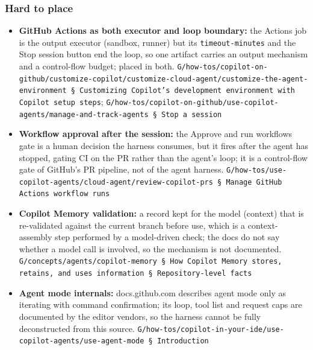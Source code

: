 \subsubsection*{Hard to place}
\begin{itemize}
\item \textbf{GitHub Actions as both executor and loop boundary:} the Actions job is the output executor (sandbox, runner) but its \texttt{timeout-\allowbreak{}minutes} and the Stop session button end the loop, so one artifact carries an output mechanism and a control-flow budget; placed in both. \texttt{G/\allowbreak{}how-\allowbreak{}tos/\allowbreak{}copilot-\allowbreak{}on-\allowbreak{}github/\allowbreak{}customize-\allowbreak{}copilot/\allowbreak{}customize-\allowbreak{}cloud-\allowbreak{}agent/\allowbreak{}customize-\allowbreak{}the-\allowbreak{}agent-\allowbreak{}environment § Customizing Copilot's development environment with Copilot setup steps}; \texttt{G/\allowbreak{}how-\allowbreak{}tos/\allowbreak{}copilot-\allowbreak{}on-\allowbreak{}github/\allowbreak{}use-\allowbreak{}copilot-\allowbreak{}agents/\allowbreak{}manage-\allowbreak{}and-\allowbreak{}track-\allowbreak{}agents § Stop a session}
\item \textbf{Workflow approval after the session:} the Approve and run workflows gate is a human decision the harness consumes, but it fires after the agent has stopped, gating CI on the PR rather than the agent's loop; it is a control-flow gate of GitHub's PR pipeline, not of the agent harness. \texttt{G/\allowbreak{}how-\allowbreak{}tos/\allowbreak{}use-\allowbreak{}copilot-\allowbreak{}agents/\allowbreak{}cloud-\allowbreak{}agent/\allowbreak{}review-\allowbreak{}copilot-\allowbreak{}prs § Manage GitHub Actions workflow runs}
\item \textbf{Copilot Memory validation:} a record kept for the model (context) that is re-validated against the current branch before use, which is a context-assembly step performed by a model-driven check; the docs do not say whether a model call is involved, so the mechanism is not documented. \texttt{G/\allowbreak{}concepts/\allowbreak{}agents/\allowbreak{}copilot-\allowbreak{}memory § How Copilot Memory stores, retains, and uses information § Repository-\allowbreak{}level facts}
\item \textbf{Agent mode internals:} docs.github.com describes agent mode only as iterating with command confirmation; its loop, tool list and request caps are documented by the editor vendors, so the harness cannot be fully deconstructed from this source. \texttt{G/\allowbreak{}how-\allowbreak{}tos/\allowbreak{}copilot-\allowbreak{}in-\allowbreak{}your-\allowbreak{}ide/\allowbreak{}use-\allowbreak{}copilot-\allowbreak{}agents/\allowbreak{}use-\allowbreak{}agent-\allowbreak{}mode § Introduction}
\end{itemize}

